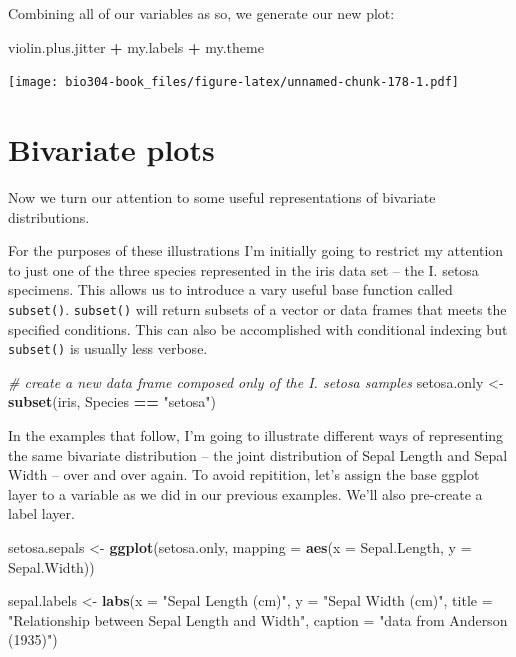 \documentclass[]{book}
\newenvironment{Shaded}{\begin{snugshade}}{\end{snugshade}}
\newcommand{\CommentTok}[1]{\textcolor[rgb]{0.56,0.35,0.01}{\textit{#1}}}
\newcommand{\DataTypeTok}[1]{\textcolor[rgb]{0.13,0.29,0.53}{#1}}
\newcommand{\KeywordTok}[1]{\textcolor[rgb]{0.13,0.29,0.53}{\textbf{#1}}}
\newcommand{\NormalTok}[1]{#1}
\newcommand{\OperatorTok}[1]{\textcolor[rgb]{0.81,0.36,0.00}{\textbf{#1}}}
\newcommand{\StringTok}[1]{\textcolor[rgb]{0.31,0.60,0.02}{#1}}
\theoremstyle{definition}
\theoremstyle{definition}
\theoremstyle{definition}
\theoremstyle{remark}
\begin{document}
Combining all of our variables as so, we generate our new plot:

\begin{Shaded}
\begin{Highlighting}[]
\NormalTok{violin.plus.jitter }\OperatorTok{+}\StringTok{ }\NormalTok{my.labels }\OperatorTok{+}\StringTok{ }\NormalTok{my.theme}
\end{Highlighting}
\end{Shaded}

\texttt{[image: bio304-book\_files/figure-latex/unnamed-chunk-178-1.pdf]}

\hypertarget{bivariate-plots}{%
\section{Bivariate plots}\label{bivariate-plots}}

Now we turn our attention to some useful representations of bivariate
distributions.

For the purposes of these illustrations I'm initially going to restrict
my attention to just one of the three species represented in the iris
data set -- the I. setosa specimens. This allows us to introduce a vary
useful base function called \texttt{subset()}. \texttt{subset()} will
return subsets of a vector or data frames that meets the specified
conditions. This can also be accomplished with conditional indexing but
\texttt{subset()} is usually less verbose.

\begin{Shaded}
\begin{Highlighting}[]
\CommentTok{# create a new data frame composed only of the I. setosa samples}
\NormalTok{setosa.only <-}\StringTok{ }\KeywordTok{subset}\NormalTok{(iris, Species }\OperatorTok{==}\StringTok{ "setosa"}\NormalTok{)}
\end{Highlighting}
\end{Shaded}

In the examples that follow, I'm going to illustrate different ways of
representing the same bivariate distribution -- the joint distribution
of Sepal Length and Sepal Width -- over and over again. To avoid
repitition, let's assign the base ggplot layer to a variable as we did
in our previous examples. We'll also pre-create a label layer.

\begin{Shaded}
\begin{Highlighting}[]
\NormalTok{setosa.sepals <-}\StringTok{ }\KeywordTok{ggplot}\NormalTok{(setosa.only, }
                        \DataTypeTok{mapping =} \KeywordTok{aes}\NormalTok{(}\DataTypeTok{x =}\NormalTok{ Sepal.Length, }\DataTypeTok{y =}\NormalTok{ Sepal.Width))}

\NormalTok{sepal.labels <-}\StringTok{ }\KeywordTok{labs}\NormalTok{(}\DataTypeTok{x =} \StringTok{"Sepal Length (cm)"}\NormalTok{, }\DataTypeTok{y =} \StringTok{"Sepal Width (cm)"}\NormalTok{,}
                     \DataTypeTok{title =} \StringTok{"Relationship between Sepal Length and Width"}\NormalTok{,}
                     \DataTypeTok{caption =} \StringTok{"data from Anderson (1935)"}\NormalTok{)}
\end{Highlighting}
\end{Shaded}
\end{document}

